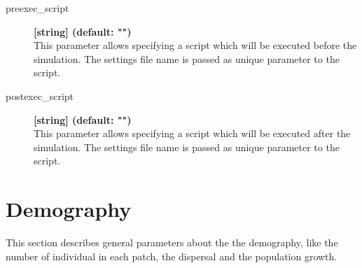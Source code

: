 \documentclass[letterpaper,12pt,oneside]{book}
\begin{document}
\begin{description}
\item[preexec\_script] \textbf{[string] (default: "")}\\
This parameter allows specifying a script which will be executed before the simulation. The settings file name is passed as unique parameter to the script.

\item[postexec\_script] \textbf{[string] (default: "")}\\
This parameter allows specifying a script which will be executed after the simulation. The settings file name is passed as unique parameter to the script.
\end{description}



\newpage
\chapter{Demography}\label{chap:population}
This section describes general parameters about the the demography, like the number of individual in each patch, the dispersal and the population growth. 
\end{document}
